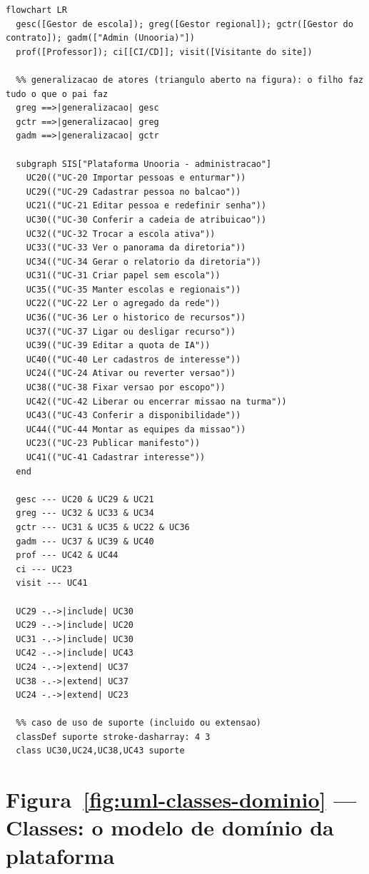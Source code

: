 \begin{lstlisting}[language=mermaid]
flowchart LR
  gesc([Gestor de escola]); greg([Gestor regional]); gctr([Gestor do contrato]); gadm(["Admin (Unooria)"])
  prof([Professor]); ci[[CI/CD]]; visit([Visitante do site])

  %% generalizacao de atores (triangulo aberto na figura): o filho faz tudo o que o pai faz
  greg ==>|generalizacao| gesc
  gctr ==>|generalizacao| greg
  gadm ==>|generalizacao| gctr

  subgraph SIS["Plataforma Unooria - administracao"]
    UC20(("UC-20 Importar pessoas e enturmar"))
    UC29(("UC-29 Cadastrar pessoa no balcao"))
    UC21(("UC-21 Editar pessoa e redefinir senha"))
    UC30(("UC-30 Conferir a cadeia de atribuicao"))
    UC32(("UC-32 Trocar a escola ativa"))
    UC33(("UC-33 Ver o panorama da diretoria"))
    UC34(("UC-34 Gerar o relatorio da diretoria"))
    UC31(("UC-31 Criar papel sem escola"))
    UC35(("UC-35 Manter escolas e regionais"))
    UC22(("UC-22 Ler o agregado da rede"))
    UC36(("UC-36 Ler o historico de recursos"))
    UC37(("UC-37 Ligar ou desligar recurso"))
    UC39(("UC-39 Editar a quota de IA"))
    UC40(("UC-40 Ler cadastros de interesse"))
    UC24(("UC-24 Ativar ou reverter versao"))
    UC38(("UC-38 Fixar versao por escopo"))
    UC42(("UC-42 Liberar ou encerrar missao na turma"))
    UC43(("UC-43 Conferir a disponibilidade"))
    UC44(("UC-44 Montar as equipes da missao"))
    UC23(("UC-23 Publicar manifesto"))
    UC41(("UC-41 Cadastrar interesse"))
  end

  gesc --- UC20 & UC29 & UC21
  greg --- UC32 & UC33 & UC34
  gctr --- UC31 & UC35 & UC22 & UC36
  gadm --- UC37 & UC39 & UC40
  prof --- UC42 & UC44
  ci --- UC23
  visit --- UC41

  UC29 -.->|include| UC30
  UC29 -.->|include| UC20
  UC31 -.->|include| UC30
  UC42 -.->|include| UC43
  UC24 -.->|extend| UC37
  UC38 -.->|extend| UC37
  UC24 -.->|extend| UC23

  %% caso de uso de suporte (incluido ou extensao)
  classDef suporte stroke-dasharray: 4 3
  class UC30,UC24,UC38,UC43 suporte
\end{lstlisting}

\section{Figura~\ref{fig:uml-classes-dominio} --- Classes: o modelo de domínio da plataforma}

